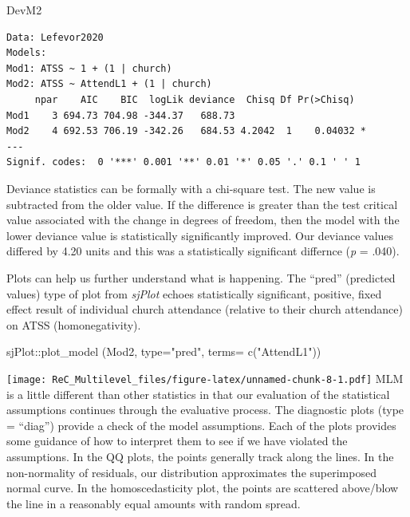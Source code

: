 \documentclass[
  11pt,
]{book}
\newenvironment{Shaded}{\begin{snugshade}}{\end{snugshade}}
\newcommand{\AttributeTok}[1]{\textcolor[rgb]{0.77,0.63,0.00}{#1}}
\newcommand{\FunctionTok}[1]{\textcolor[rgb]{0.00,0.00,0.00}{#1}}
\newcommand{\NormalTok}[1]{#1}
\newcommand{\SpecialCharTok}[1]{\textcolor[rgb]{0.00,0.00,0.00}{#1}}
\newcommand{\StringTok}[1]{\textcolor[rgb]{0.31,0.60,0.02}{#1}}
\begin{document}
\begin{Shaded}
\begin{Highlighting}[]
\NormalTok{DevM2}
\end{Highlighting}
\end{Shaded}

\begin{verbatim}
Data: Lefevor2020
Models:
Mod1: ATSS ~ 1 + (1 | church)
Mod2: ATSS ~ AttendL1 + (1 | church)
     npar    AIC    BIC  logLik deviance  Chisq Df Pr(>Chisq)  
Mod1    3 694.73 704.98 -344.37   688.73                       
Mod2    4 692.53 706.19 -342.26   684.53 4.2042  1    0.04032 *
---
Signif. codes:  0 '***' 0.001 '**' 0.01 '*' 0.05 '.' 0.1 ' ' 1
\end{verbatim}

Deviance statistics can be formally with a chi-square test. The new value is subtracted from the older value. If the difference is greater than the test critical value associated with the change in degrees of freedom, then the model with the lower deviance value is statistically significantly improved. Our deviance values differed by 4.20 units and this was a statistically significant differnce (\emph{p} = .040).

Plots can help us further understand what is happening. The ``pred'' (predicted values) type of plot from \emph{sjPlot} echoes statistically significant, positive, fixed effect result of individual church attendance (relative to their church attendance) on ATSS (homonegativity).

\begin{Shaded}
\begin{Highlighting}[]
\NormalTok{sjPlot}\SpecialCharTok{::}\FunctionTok{plot\_model}\NormalTok{ (Mod2, }\AttributeTok{type=}\StringTok{"pred"}\NormalTok{, }\AttributeTok{terms=} \FunctionTok{c}\NormalTok{(}\StringTok{"AttendL1"}\NormalTok{))}
\end{Highlighting}
\end{Shaded}

\texttt{[image: ReC\_Multilevel\_files/figure-latex/unnamed-chunk-8-1.pdf]}
MLM is a little different than other statistics in that our evaluation of the statistical assumptions continues through the evaluative process. The diagnostic plots (type = ``diag'') provide a check of the model assumptions. Each of the plots provides some guidance of how to interpret them to see if we have violated the assumptions. In the QQ plots, the points generally track along the lines. In the non-normality of residuals, our distribution approximates the superimposed normal curve. In the homoscedasticity plot, the points are scattered above/blow the line in a reasonably equal amounts with random spread.
\end{document}
